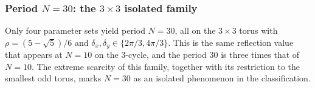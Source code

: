 \subsubsection{Period $N = 30$: the $3 \times 3$ isolated family}

Only four parameter sets yield period $N = 30$, all on the $3 \times 3$
torus with $\rho = (5-\sqrt{5})/6$ and
$\delta_x, \delta_y \in \{2\pi/3, 4\pi/3\}$. This is the same
reflection value that appears at $N = 10$ on the $3$-cycle, and the
period $30$ is three times that of $N = 10$. The extreme scarcity of
this family, together with its restriction to the smallest odd torus,
marks $N = 30$ as an isolated phenomenon in the classification.
